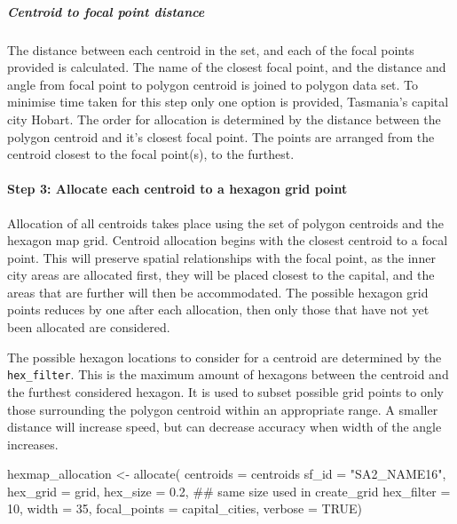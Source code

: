 \hypertarget{centroid-to-focal-point-distance}{%
\subparagraph{Centroid to focal point
distance}\label{centroid-to-focal-point-distance}}

The distance between each centroid in the set, and each of the focal
points provided is calculated. The name of the closest focal point, and
the distance and angle from focal point to polygon centroid is joined to
polygon data set. To minimise time taken for this step only one option
is provided, Tasmania's capital city Hobart. The order for allocation is
determined by the distance between the polygon centroid and it's closest
focal point. The points are arranged from the centroid closest to the
focal point(s), to the furthest.

\hypertarget{step-3-allocate-each-centroid-to-a-hexagon-grid-point}{%
\paragraph{Step 3: Allocate each centroid to a hexagon grid
point}\label{step-3-allocate-each-centroid-to-a-hexagon-grid-point}}

Allocation of all centroids takes place using the set of polygon
centroids and the hexagon map grid. Centroid allocation begins with the
closest centroid to a focal point. This will preserve spatial
relationships with the focal point, as the inner city areas are
allocated first, they will be placed closest to the capital, and the
areas that are further will then be accommodated. The possible hexagon
grid points reduces by one after each allocation, then only those that
have not yet been allocated are considered.

The possible hexagon locations to consider for a centroid are determined
by the \texttt{hex\_filter}. This is the maximum amount of hexagons
between the centroid and the furthest considered hexagon. It is used to
subset possible grid points to only those surrounding the polygon
centroid within an appropriate range. A smaller distance will increase
speed, but can decrease accuracy when width of the angle increases.

\begin{Schunk}
\begin{Sinput}
hexmap_allocation <- allocate(
  centroids = centroids %
  sf_id = "SA2_NAME16",
  hex_grid = grid,
  hex_size = 0.2, ## same size used in create_grid
  hex_filter = 10,
  width = 35,
  focal_points = capital_cities,
  verbose = TRUE)
\end{Sinput}
\end{Schunk}

